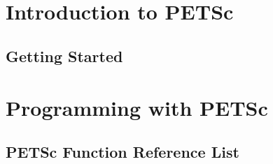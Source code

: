 

\medskip \medskip

%
\newpage \hbox{ } \newpage


\newpage \hbox{ } \newpage

\setcounter{page}{3}
\tableofcontents
\clearpage
{}


\part{Introduction to PETSc}
\label{part:intro}
\chapter{Getting Started}


\part{Programming with PETSc}
\label{part:usage}




\appendix

\chapter{PETSc Function Reference List}



\vfill
\eject


\newpage









